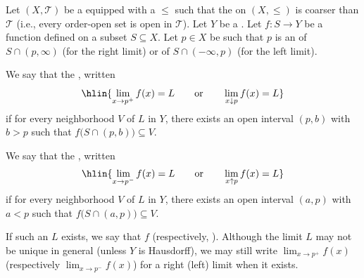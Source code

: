 \begin{definition} \label{definition:right_limit_and_left_limit_of_a_function_at_a_point_in_an_ordered_topological_space}
    Let $(X, \mathcal{T})$ be a  equipped with a  $\leq$ such that the  on $(X, \leq)$ is coarser than $\mathcal{T}$ (i.e., every order-open set is open in $\mathcal{T}$). Let $Y$ be a . Let $f: S \to Y$ be a function defined on a subset $S \subseteq X$. Let $p \in X$ be such that $p$ is an  of $S \cap (p, \infty)$ (for the right limit) or of $S \cap (-\infty, p)$ (for the left limit).

    We say that the , written
    $$\hlin{\lim_{x \to p^+} f(x) = L \qquad\text{or}\qquad \lim_{x \downarrow p} f(x) = L}$$
    if for every neighborhood $V$ of $L$ in $Y$, there exists an open interval $(p, b)$ with $b > p$ such that $f\bigl( S \cap (p, b) \bigr) \subseteq V$.

    We say that the , written
    $$\hlin{\lim_{x \to p^-} f(x) = L \qquad\text{or}\qquad \lim_{x \uparrow p} f(x) = L}$$
    if for every neighborhood $V$ of $L$ in $Y$, there exists an open interval $(a, p)$ with $a < p$ such that $f\bigl( S \cap (a, p) \bigr) \subseteq V$.

    If such an $L$ exists, we say that $f$  (respectively, ). Although the limit $L$ may not be unique in general (unless $Y$ is Hausdorff), we may still write $\lim_{x \to p^+} f(x)$ (respectively $\lim_{x \to p^-} f(x)$) for a right (left) limit when it exists.

\end{definition}